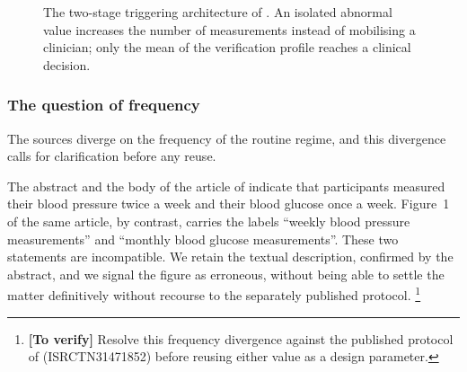 \documentclass[12pt,a4paper,oneside]{report}
\newcommand{\verify}[1]{\footnote{\textbf{[To verify]} #1}}
\begin{document}
\begin{figure}[htbp]
\centering
{}
\caption{The two-stage triggering architecture of \textcite{mihevc2025}. An isolated abnormal value increases the number of measurements instead of mobilising a clinician; only the mean of the verification profile reaches a clinical decision.}\label{fig:triage}
\end{figure}

\subsubsection{The question of frequency}

The sources diverge on the frequency of the routine regime, and this divergence calls for clarification before any reuse.

The abstract and the body of the article of \textcite{mihevc2025} indicate that participants measured their blood pressure twice a week and their blood glucose once a week. Figure~1 of the same article, by contrast, carries the labels ``weekly blood pressure measurements'' and ``monthly blood glucose measurements''. These two statements are incompatible. We retain the textual description, confirmed by the abstract, and we signal the figure as erroneous, without being able to settle the matter definitively without recourse to the separately published protocol.%
\verify{Resolve this frequency divergence against the published protocol of \textcite{mihevc2025} (ISRCTN31471852) before reusing either value as a design parameter.}
\end{document}
